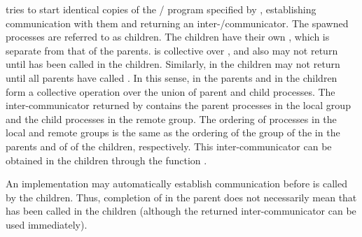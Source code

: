  tries to start  identical copies
of the \MPI/ program specified by , establishing
communication with them and returning an inter\hyphen/communicator.
The spawned processes are referred to as children.
The children have their own
, which is separate from that of the parents.
 is collective over , and also may not
return until  has been called in the children.
Similarly,  in the children may not return
until all parents have called . In this
sense,  in the parents and 
in the children form a collective operation over the union
of parent and child processes.
The inter-communicator
returned by  contains the parent processes in
the local group and the child processes in the remote group.
The ordering of processes in the local and remote groups is the same
as the
ordering of the group of the 
in the parents
and of  of the children, respectively.
This inter-communicator can be obtained in the children through the function
.

\begin{users}
An implementation may automatically establish communication before
 is called by the children. Thus, completion of
 in the parent does not necessarily mean that
 has been called in the children (although the
returned inter-communicator can be used immediately).
\end{users}

